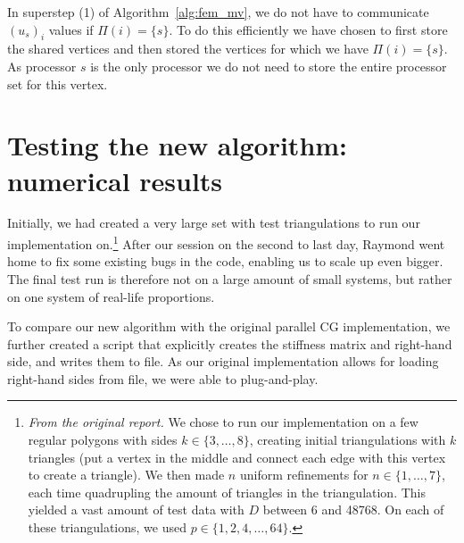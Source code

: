 \documentclass[11pt]{amsart}
\theoremstyle{definition}
\begin{document}
In superstep (1) of Algorithm~\ref{alg:fem_mv}, we do not have to communicate $(u_s)_i$ values if $\Pi(i) = \{s\}$. To do this efficiently we have chosen to first store the shared vertices and then stored the vertices for which we have $\Pi(i)=\{s\}$. As processor $s$ is the only processor we do not need to store the entire processor set for this vertex.

\section{Testing the new algorithm: numerical results}
Initially, we had created a very large set with test triangulations to run our implementation on.\footnote{\emph{From the original report.} We chose to run our implementation on a few regular polygons with sides $k \in \{3, \ldots, 8\}$, creating initial triangulations with $k$ triangles (put a vertex in the middle and connect each edge with this vertex to create a triangle). We then made $n$ uniform refinements for $n \in \{1, \ldots, 7\}$, each time quadrupling the amount of triangles in the triangulation. This yielded a vast amount of test data with $D$ between 6 and 48768. On each of these triangulations, we used $p \in \{1, 2, 4, \ldots, 64\}$.} After our session on the second to last day, Raymond went home to fix some existing bugs in the code, enabling us to scale up even bigger. The final test run is therefore not on a large amount of small systems, but rather on one system of real-life proportions.

To compare our new algorithm with the original parallel CG implementation, we further created a script that explicitly creates the stiffness matrix and right-hand side, and writes them to file. As our original implementation allows for loading right-hand sides from file, we were able to plug-and-play.
\end{document}
